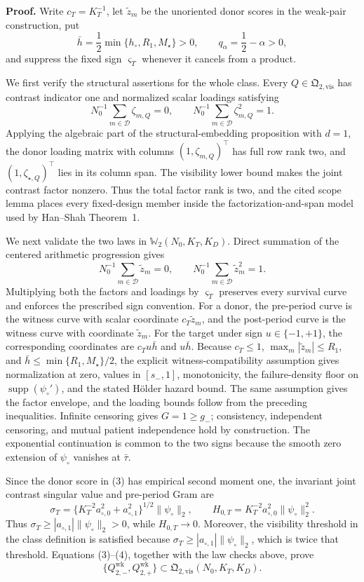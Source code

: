 \textbf{Proof.}
Write \(c_T=K_T^{-1}\), let \(\widetilde z_m\) be the unoriented donor scores in the weak-pair construction, put
\[
 \bar h=\frac12\min\{h_\circ,R_1,M_\star\}>0,
 \qquad q_\alpha=\frac12-\alpha>0,                       \tag{1}
\]
and suppress the fixed sign \(\varsigma_T\) whenever it cancels from a product.

We first verify the structural assertions for the whole class.  Every \(Q\in\mathfrak Q_{2,\mathrm{vis}}\) has contrast indicator one and normalized scalar loadings satisfying
\[
 N_0^{-1}\sum_{m\in\mathcal D}\zeta_{m,Q}=0,
 \qquad
 N_0^{-1}\sum_{m\in\mathcal D}\zeta_{m,Q}^2=1.          \tag{2}
\]
Applying the algebraic part of the structural-embedding proposition with \(d=1\), the donor loading matrix with columns \((1,\zeta_{m,Q})^\top\) has full row rank two, and \((1,\zeta_{\star,Q})^\top\) lies in its column span.  The visibility lower bound makes the joint contrast factor nonzero.  Thus the total factor rank is two, and the cited scope lemma places every fixed-design member inside the factorization-and-span model used by Han--Shah Theorem~1.

We next validate the two laws in \(\mathbb W_2(N_0,K_T,K_D)\).  Direct summation of the centered arithmetic progression gives
\[
 N_0^{-1}\sum_{m\in\mathcal D}\widetilde z_m=0,
 \qquad
 N_0^{-1}\sum_{m\in\mathcal D}\widetilde z_m^2=1.       \tag{3}
\]
Multiplying both the factors and loadings by \(\varsigma_T\) preserves every survival curve and enforces the prescribed sign convention.  For a donor, the pre-period curve is the witness curve with scalar coordinate \(c_T\widetilde z_m\), and the post-period curve is the witness curve with coordinate \(\widetilde z_m\).  For the target under sign \(u\in\{-1,+1\}\), the corresponding coordinates are \(c_Tu\bar h\) and \(u\bar h\).  Because \(c_T\le1\), \(\max_m|\widetilde z_m|\le R_1\), and \(\bar h\le\min\{R_1,M_\star\}/2\), the explicit witness-compatibility assumption gives normalization at zero, values in \([s_-,1]\), monotonicity, the failure-density floor on \(\operatorname{supp}(\psi_\circ')\), and the stated H\"older hazard bound.  The same assumption gives the factor envelope, and the loading bounds follow from the preceding inequalities.  Infinite censoring gives \(G=1\ge g_-\); consistency, independent censoring, and mutual patient independence hold by construction.  The exponential continuation is common to the two signs because the smooth zero extension of \(\psi_\circ\) vanishes at \(\bar\tau\).

Since the donor score in (3) has empirical second moment one, the invariant joint contrast singular value and pre-period Gram are
\[
 \sigma_T=\{K_T^{-2}a_{\circ,0}^2+a_{\circ,1}^2\}^{1/2}
             \|\psi_\circ\|_2,
 \qquad
 H_{0,T}=K_T^{-2}a_{\circ,0}^2\|\psi_\circ\|_2^2.       \tag{4}
\]
Thus \(\sigma_T\ge |a_{\circ,1}|\|\psi_\circ\|_2>0\), while \(H_{0,T}\to0\).  Moreover, the visibility threshold in the class definition is satisfied because \(\sigma_T\ge |a_{\circ,1}|\|\psi_\circ\|_2\), which is twice that threshold.  Equations (3)--(4), together with the law checks above, prove
\[
 \{Q_{2,-}^{\mathrm{wk}},Q_{2,+}^{\mathrm{wk}}\}
 \subset\mathfrak Q_{2,\mathrm{vis}}(N_0,K_T,K_D).       \tag{5}
\]

